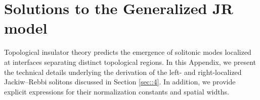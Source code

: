 \documentclass[a4paper,twocolumn,floatfix,10pt,superscriptaddress]%
{quantumarticle}
\newcommand{\mcrc}[1]{{\color{mcrcolor}{[MCR: #1]}}}
\newcommand{\mcl}[1]{\mathcal{#1}}
\newcommand{\mcH}{{\mcl{H}}}
\begin{document}
\section{Solutions to the Generalized JR model}\label{App:JRmodel}
Topological insulator theory predicts the emergence of solitonic modes localized at interfaces separating distinct topological regions. In this Appendix, we present the technical details underlying the derivation of the left- and right-localized Jackiw–Rebbi solitons discussed in Section \ref{sec::4}. In addition, we provide explicit expressions for their normalization constants and spatial widths.
\end{document}
